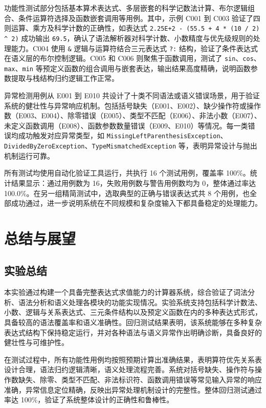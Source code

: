 \documentclass[a4paper, twoside, utf8]{ctexart}
\begin{document}
    功能性测试部分包括基本算术表达式、多层嵌套的科学记数法计算、布尔逻辑组合、条件运算符选择及函数嵌套调用等用例。其中，示例 C001 到 C003 验证了四则运算、乘方及科学计数的正确性，如表达式 \verb|2.25E+2 - (55.5 + 4 * (10 / 2) ^ 2)| 成功输出 \verb|69.5|，确认了语法解析器对科学计数、小数精度与优先级规则的处理能力。C004 使用 \verb|&| 逻辑与运算符结合三元表达式 \verb|?:| 结构，验证了条件表达式在语义层的布尔控制逻辑。C005 和 C006 则聚焦于函数调用，测试了 \verb|sin|、\verb|cos|、\verb|max|、\verb|min| 等预定义函数的组合调用与嵌套表达，输出结果高度精确，说明函数参数提取与栈结构归约逻辑工作正常。
    
    异常检测用例从 E001 到 E010 共设计了十类不同语法或语义错误场景，用于验证系统的健壮性与异常响应机制。包括括号缺失（E001、E002）、缺少操作符或操作数（E003、E004）、除零错误（E005）、类型不匹配（E006）、非法小数（E007）、未定义函数调用（E008）、函数参数数量错误（E009、E010）等情况。每一类错误均成功触发对应异常类型，如 \verb|MissingLeftParenthesisException|、\verb|DividedByZeroException|、\verb|TypeMismatchedException| 等，表明异常设计与抛出机制运行可靠。
    
    所有测试均使用自动化验证工具运行，共执行 16 个测试用例，覆盖率 100\%。统计结果显示：通过用例数为 16，失败用例数与警告用例数均为 0，整体通过率达 100.0\%。在另一组精简测试中，选取典型的正确与错误表达式共 8 个用例，也全部成功通过，进一步说明系统在不同规模和复杂度输入下都具备稳定的处理能力。

    \section{总结与展望}

    \subsection{实验总结}

    本实验通过构建一个具备完整表达式求值能力的计算器系统，综合验证了词法分析、语法分析和语义处理各模块的功能实现情况。实验系统支持包括科学计数法、小数、逻辑与关系表达式、三元条件结构以及预定义函数在内的多种表达式形式，具备较高的语法覆盖率和语义准确性。回归测试结果表明，该系统能够在多种复杂表达式结构下保持稳定运行，并对各种语法与语义异常作出明确诊断，具备良好的健壮性与可维护性。

    在测试过程中，所有功能性用例均按照预期计算出准确结果，表明算符优先关系表设计合理，语法归约逻辑清晰，语义处理流程完善。系统对括号缺失、操作符与操作数缺失、除零、类型不匹配、非法标识符、函数调用错误等常见输入异常的响应准确，异常信息定位精确，反映出异常处理机制设计的完整性。整体回归测试通过率达 100\%，验证了系统整体设计的正确性和鲁棒性。
\end{document}
